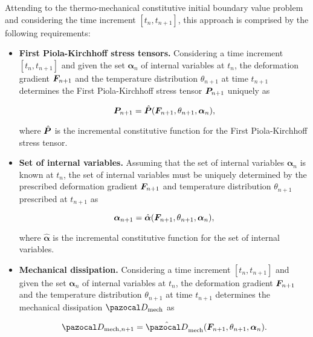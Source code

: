Attending to the thermo-mechanical constitutive initial boundary value problem and considering the time increment $[t_n, t_{n+1}]$, this approach is comprised by the following requirements:
\begin{itemize}
    \item \textbf{First Piola-Kirchhoff stress tensors.} Considering a time increment $[t_n, t_{n+1}]$ and given the set $\bm \alpha_n$ of internal variables at $t_n$, the deformation gradient $\bm{F}_{n+1}$ and the temperature distribution \(\theta_{n+1}\) at time $t_{n+1}$ determines the First Piola-Kirchhoff stress tensor $\bm{P}_{n+1}$ uniquely as
    \begin{highlight}
      \begin{equation}
          \bm{P}_{n+1} = \hat{\bm{P}}(\bm{F}_{n+1}, \theta_{n+1}, \bm{\alpha}_n),
      \end{equation}
    \end{highlight}
    where $\hat{\bm{P}}$ is the incremental constitutive function for the First Piola-Kirchhoff stress tensor.
    \item \textbf{Set of internal variables.} Assuming that the set of internal variables $\bm \alpha_n$ is known at $t_n$, the set of internal variables must be uniquely determined by the prescribed deformation gradient $\bm{F}_{n+1}$ and temperature distribution \(\theta_{n+1}\) prescribed at $t_{n+1}$ as
    \begin{highlight}
        \begin{equation}
             \bm \alpha_{n+1} =\hat{\bm \alpha}(\bm{F}_{n+1}, \theta_{n+1}, \bm{\alpha}_n), \label{eq:incremental_flux}
        \end{equation}
    \end{highlight}
    where $\hat{\bm \alpha}$ is the incremental constitutive function for the set of internal variables.

    \item \textbf{Mechanical dissipation.}
 Considering a time increment $[t_n, t_{n+1}]$ and given the set $\bm \alpha_n$ of internal variables at $t_n$, the deformation gradient $\bm{F}_{n+1}$ and the temperature distribution \(\theta_{n+1}\) at time $t_{n+1}$ determines the mechanical dissipation \(\pazocal D_\text{mech}\) as
    \begin{highlight}
    \begin{equation}
    \pazocal D_{\text{mech},n+1} = \hat{\pazocal D}_\text{mech}(\bm F_{n+1}, \theta_{n+1}, \bm \alpha_n).
    \end{equation}
    \end{highlight}


\end{itemize}
